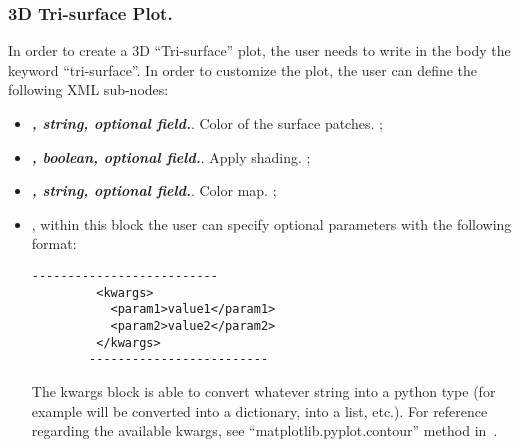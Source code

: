 \subsubsection{3D Tri-surface Plot.}
In order to create a 3D ``Tri-surface'' plot, the user needs to write in the
 body the keyword ``tri-surface''.
%
In order to customize the plot, the user can define the following XML sub-nodes:
  \begin{itemize}
  \item {}\textbf{\textit{, string, optional field.}}.
  Color of the surface patches.
  ;
  \item {}\textbf{\textit{, boolean, optional field.}}.
  Apply shading.
  ;
  \item {}\textbf{\textit{, string, optional field.}}.
  Color map.
  ;
  \item \textit{}, within this block the user can specify optional
  parameters with the following format:
        \begin{lstlisting}[style=XML]
        --------------------------
         <kwargs>
           <param1>value1</param1>
           <param2>value2</param2>
         </kwargs>
        -------------------------
       \end{lstlisting}
  The kwargs block is able to convert whatever string into a python type (for
  example  will be converted into a
  dictionary,  into a list, etc.).
  For reference regarding the available kwargs, see
  ``matplotlib.pyplot.contour'' method in~\cite{MatPlotLib}.
    \end{itemize}

